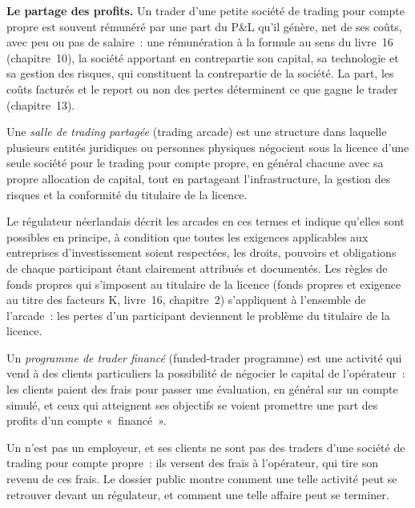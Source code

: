 \textbf{Le partage des profits.} Un trader d'une petite société de trading pour compte propre est souvent rémunéré par une part du P\&L qu'il génère, net de ses coûts,
avec peu ou pas de salaire~: une rémunération à la formule au sens du livre~16 (chapitre~10), la société apportant en contrepartie son capital,
sa technologie et sa gestion des risques, qui constituent la contrepartie de la société. La part, les coûts facturés et le report ou non des pertes
déterminent ce que gagne le trader (chapitre~13).

\begin{definition}\label{def:in:medium-frequency-proprietary-shops:arcade}
Une \emph{salle de trading partagée} (trading arcade) est une structure dans laquelle plusieurs entités juridiques ou personnes physiques négocient
sous la licence d'une seule société pour le trading pour compte propre, en général chacune avec sa propre allocation de capital,
tout en partageant l'infrastructure, la gestion des risques et la conformité du titulaire de la licence.
\end{definition}

Le régulateur néerlandais décrit les arcades en ces termes et indique qu'elles sont possibles en principe, à condition que toutes
les exigences applicables aux entreprises d'investissement soient respectées, les droits, pouvoirs et obligations de chaque participant étant clairement
attribués et documentés. Les règles de fonds propres qui s'imposent au titulaire de la licence (fonds propres et exigence au titre des facteurs K, livre~16,
chapitre~2) s'appliquent à l'ensemble de l'arcade~: les pertes d'un participant deviennent le problème du titulaire de la licence.

\begin{definition}\label{def:in:medium-frequency-proprietary-shops:funded}
Un \emph{programme de trader financé} (funded-trader programme) est une activité qui vend à des clients particuliers la possibilité de
négocier le capital de l'opérateur~: les clients paient des frais pour passer une évaluation, en général sur un compte simulé, et ceux qui
atteignent ses objectifs se voient promettre une part des profits d'un compte «~financé~».
\end{definition}

Un  n'est pas un employeur, et ses clients ne sont pas des traders d'une société de trading pour compte propre~: ils versent
des frais à l'opérateur, qui tire son revenu de ces frais. Le dossier public montre comment une telle activité peut se retrouver
devant un régulateur, et comment une telle affaire peut se terminer.

